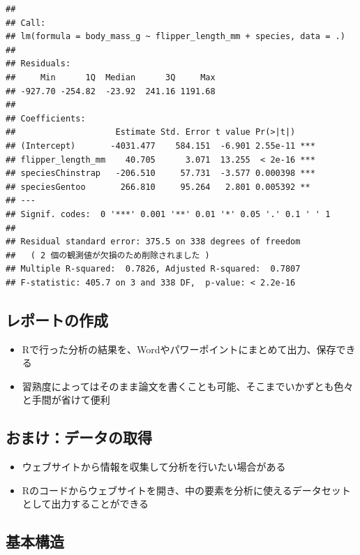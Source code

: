 \documentclass[
]{ltjsarticle}
\providecommand{\tightlist}{%
  \setlength{\itemsep}{0pt}\setlength{\parskip}{0pt}}
\begin{document}
\begin{verbatim}
## 
## Call:
## lm(formula = body_mass_g ~ flipper_length_mm + species, data = .)
## 
## Residuals:
##     Min      1Q  Median      3Q     Max 
## -927.70 -254.82  -23.92  241.16 1191.68 
## 
## Coefficients:
##                    Estimate Std. Error t value Pr(>|t|)    
## (Intercept)       -4031.477    584.151  -6.901 2.55e-11 ***
## flipper_length_mm    40.705      3.071  13.255  < 2e-16 ***
## speciesChinstrap   -206.510     57.731  -3.577 0.000398 ***
## speciesGentoo       266.810     95.264   2.801 0.005392 ** 
## ---
## Signif. codes:  0 '***' 0.001 '**' 0.01 '*' 0.05 '.' 0.1 ' ' 1
## 
## Residual standard error: 375.5 on 338 degrees of freedom
##   ( 2 個の観測値が欠損のため削除されました )
## Multiple R-squared:  0.7826, Adjusted R-squared:  0.7807 
## F-statistic: 405.7 on 3 and 338 DF,  p-value: < 2.2e-16
\end{verbatim}

\hypertarget{ux30ecux30ddux30fcux30c8ux306eux4f5cux6210}{%
\subsection{レポートの作成}\label{ux30ecux30ddux30fcux30c8ux306eux4f5cux6210}}

\begin{itemize}
\tightlist
\item
  Rで行った分析の結果を、Wordやパワーポイントにまとめて出力、保存できる
\item
  習熟度によってはそのまま論文を書くことも可能、そこまでいかずとも色々と手間が省けて便利
\end{itemize}

\hypertarget{ux304aux307eux3051ux30c7ux30fcux30bfux306eux53d6ux5f97}{%
\subsection{おまけ：データの取得}\label{ux304aux307eux3051ux30c7ux30fcux30bfux306eux53d6ux5f97}}

\begin{itemize}
\tightlist
\item
  ウェブサイトから情報を収集して分析を行いたい場合がある
\item
  Rのコードからウェブサイトを開き、中の要素を分析に使えるデータセットとして出力することができる
\end{itemize}

\hypertarget{ux57faux672cux69cbux9020}{%
\subsection{基本構造}\label{ux57faux672cux69cbux9020}}
\end{document}
